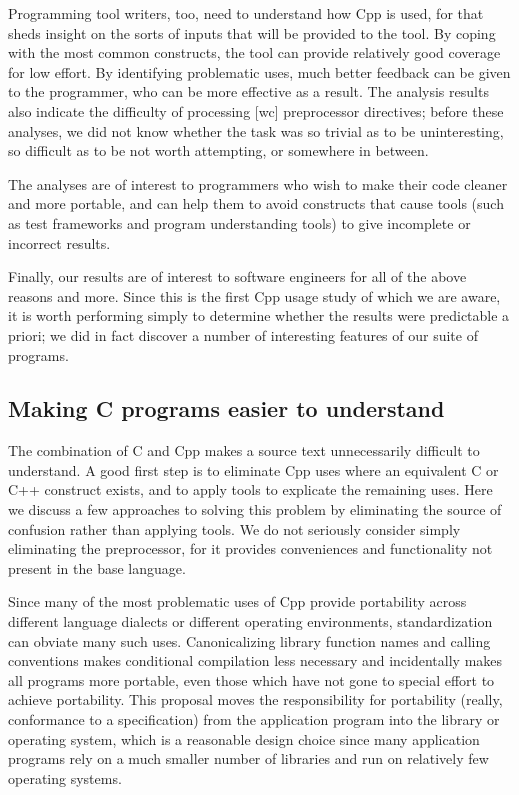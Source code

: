 \documentclass[10pt]{article}
\begin{document}
Programming tool writers, too, need to understand how Cpp is used, for that
sheds insight on the sorts of inputs that will be provided to the tool.  By
coping with the most common constructs, the tool can provide relatively
good coverage for low effort.  By identifying problematic uses, much better
feedback can be given to the programmer, who can be more effective as a
result.  The analysis results also indicate the difficulty of processing [wc]
preprocessor directives; before these analyses, we did not know whether the
task was so trivial as to be uninteresting, so difficult as to be not worth
attempting, or somewhere in between.

The analyses are of interest to programmers who wish to make their code
cleaner and more portable, and can help them to avoid constructs that cause
tools (such as test frameworks and program understanding tools)
to give incomplete or incorrect results.


Finally, our results are of interest to software engineers for all of the
above reasons and more.  Since this is the first Cpp usage study of which
we are aware, it is worth performing simply to determine whether the
results were predictable a priori; we did in fact discover a number of
interesting features of our suite of programs.


\subsection{Making C programs easier to understand}

The combination of C and Cpp makes a source text unnecessarily difficult to
understand.  A good first step is to eliminate Cpp uses where an equivalent
C or C++ construct exists, and to apply tools to explicate the remaining
uses.  Here we discuss a few approaches to solving this problem by
eliminating the source of confusion rather than applying tools.  We do not
seriously consider simply eliminating the preprocessor, for it provides
conveniences and functionality not present in the base language.

Since many of the most problematic uses of Cpp provide portability across
different language dialects or different operating environments,
standardization can obviate many such uses.  Canonicalizing library
function names and calling conventions makes conditional compilation less
necessary and incidentally makes all programs more portable, even those
which have not gone to special effort to achieve portability.  This
proposal moves the responsibility for portability (really, conformance to a
specification) from the application program into the library or operating
system, which is a reasonable design choice since many application programs
rely on a much smaller number of libraries and run on relatively few
operating systems.
\end{document}
